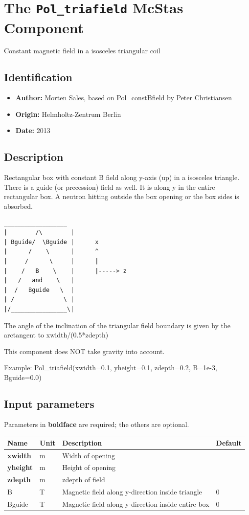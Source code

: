 \section{The \texttt{Pol\_triafield} McStas Component}
Constant magnetic field in a isosceles triangular coil

\subsection*{Identification}
\begin{itemize}
  \item \textbf{Author:} Morten Sales, based on Pol\_constBfield by Peter Christiansen
  \item \textbf{Origin:} Helmholtz-Zentrum Berlin
  \item \textbf{Date:} 2013
\end{itemize}

\subsection*{Description}
Rectangular box with constant B field along y-axis (up) in a isosceles triangle. There is a guide (or precession) field as well. It is along y in the entire rectangular box. A neutron hitting outside the box opening or the box sides is absorbed.

\begin{verbatim}
__________________
|        /\        |
| Bguide/  \Bguide |      x
|      /    \      |      ^
|     /      \     |      |
|    /   B    \    |      |-----> z
|   /   and    \   |
|  /   Bguide   \  |
| /              \ |
|/________________\|
\end{verbatim}

The angle of the inclination of the triangular field boundary is given by the arctangent to xwidth/(0.5*zdepth)

This component does NOT take gravity into account.

Example: Pol\_triafield(xwidth=0.1, yheight=0.1, zdepth=0.2, B=1e-3, Bguide=0.0)

\subsection*{Input parameters}
Parameters in \textbf{boldface} are required; the others are optional.

\begin{longtable}{p{}p{}p{}p{}}
\toprule
\textbf{Name} & \textbf{Unit} & \textbf{Description} & \textbf{Default} \\
\midrule
\endhead
\textbf{xwidth} & m & Width of opening &  \\
\textbf{yheight} & m & Height of opening &  \\
\textbf{zdepth} & m & zdepth of field &  \\
B & T & Magnetic field along y-direction inside triangle & 0 \\
Bguide & T & Magnetic field along y-direction inside entire box & 0 \\
\bottomrule
\end{longtable}

